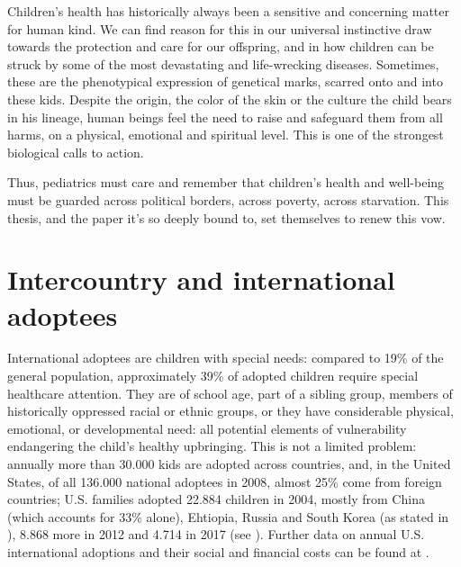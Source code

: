 

\label{chap:introduction}
Children's health has historically always been a sensitive and concerning matter for human kind. We can find reason for this in our universal instinctive draw towards the protection and care for our offspring, and in how children can be struck by some of the most devastating and life-wrecking diseases. Sometimes, these are the phenotypical expression of genetical marks, scarred onto and into these kids. Despite the origin, the color of the skin or the culture the child bears in his lineage, human beings feel the need to raise and safeguard them from all harms, on a physical, emotional and spiritual level. This is one of the strongest biological calls to action.

Thus, pediatrics must care and remember that children's health and well-being must be guarded across political borders, across poverty, across starvation. This thesis, and the paper it's so deeply bound to, set themselves to renew this vow.

\section{Intercountry and international adoptees}\label{sec:internationaladoptees}
International adoptees are children with special needs: compared to 19\% of the general population, approximately 39\% of adopted children require special healthcare attention\cite{nelson}. They are of school age, part of a sibling group, members of historically oppressed racial or ethnic groups, or they have considerable physical, emotional, or developmental need\cite{nelson}: all potential elements of vulnerability endangering the child's healthy upbringing. This is not a limited problem: annually more than 30.000 kids are adopted across countries, and, in the United States, of all 136.000 national adoptees in 2008, almost 25\% come from foreign countries; U.S. families adopted 22.884 children in 2004, mostly from China (which accounts for 33\% alone), Ehtiopia, Russia and South Korea (as stated in \cite{nelson}), 8.868 more in 2012 and 4.714 in 2017 (see \cite{usreport}). Further data on annual U.S. international adoptions and their social and financial costs can be found at \cite{usreportsite}.

